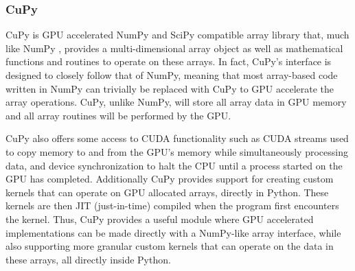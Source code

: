 \subsubsection{CuPy} \label{background:implementation_tools_and_libraries:cupy}
CuPy is GPU accelerated NumPy \cite{numpy} and SciPy \cite{scipy} compatible array library that, much like NumPy \cite{numpy}, provides a multi-dimensional array object as well as mathematical functions and routines to operate on these arrays.
In fact, CuPy's interface is designed to closely follow that of NumPy, meaning that most array-based code written in NumPy can trivially be replaced with CuPy to GPU accelerate the array operations.
CuPy, unlike NumPy, will store all array data in GPU memory and all array routines will be performed by the GPU.

CuPy also offers some access to CUDA functionality such as CUDA streams used to copy memory to and from the GPU's memory while simultaneously processing data, and device synchronization to halt the CPU until a process started on the GPU has completed.
Additionally CuPy provides support for creating custom kernels that can operate on GPU allocated arrays, directly in Python.
These kernels are then JIT (just-in-time) compiled when the program first encounters the kernel.
Thus, CuPy provides a useful module where GPU accelerated implementations can be made directly with a NumPy-like array interface, while also supporting more granular custom kernels that can operate on the data in these arrays, all directly inside Python.
